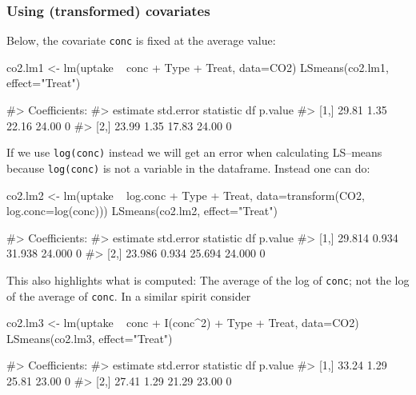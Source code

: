 \hypertarget{using-transformed-covariates}{%
\subsubsection{Using (transformed)
covariates}\label{using-transformed-covariates}}

Below, the covariate \texttt{conc} is fixed at the average value:

\begin{Schunk}
\begin{Sinput}
co2.lm1 <- lm(uptake ~ conc + Type + Treat, data=CO2)
LSmeans(co2.lm1, effect="Treat")
\end{Sinput}
\begin{Soutput}
#> Coefficients:
#>      estimate std.error statistic    df p.value
#> [1,]    29.81      1.35     22.16 24.00       0
#> [2,]    23.99      1.35     17.83 24.00       0
\end{Soutput}
\end{Schunk}

If we use \texttt{log(conc)} instead we will get an error when
calculating LS--means because \texttt{log(conc)} is not a variable in
the dataframe. Instead one can do:

\begin{Schunk}
\begin{Sinput}
co2.lm2 <- lm(uptake ~ log.conc + Type + Treat,
             data=transform(CO2, log.conc=log(conc)))
LSmeans(co2.lm2, effect="Treat")
\end{Sinput}
\begin{Soutput}
#> Coefficients:
#>      estimate std.error statistic     df p.value
#> [1,]   29.814     0.934    31.938 24.000       0
#> [2,]   23.986     0.934    25.694 24.000       0
\end{Soutput}
\end{Schunk}

This also highlights what is computed: The average of the log of
\texttt{conc}; not the log of the average of \texttt{conc}. In a similar
spirit consider

\begin{Schunk}
\begin{Sinput}
co2.lm3 <- lm(uptake ~ conc + I(conc^2) + Type + Treat, data=CO2)
LSmeans(co2.lm3, effect="Treat")
\end{Sinput}
\begin{Soutput}
#> Coefficients:
#>      estimate std.error statistic    df p.value
#> [1,]    33.24      1.29     25.81 23.00       0
#> [2,]    27.41      1.29     21.29 23.00       0
\end{Soutput}
\end{Schunk}

